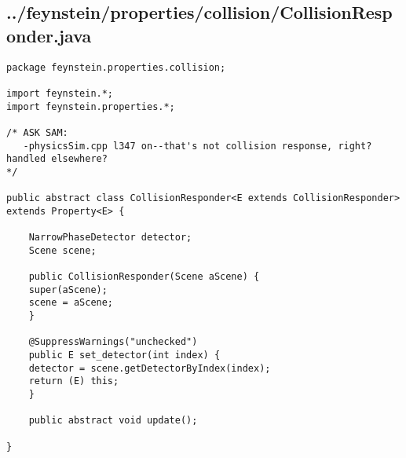 \subsection*{../feynstein/properties/collision/CollisionResponder.java}
\begin{lstlisting}
package feynstein.properties.collision;

import feynstein.*;
import feynstein.properties.*;

/* ASK SAM:
   -physicsSim.cpp l347 on--that's not collision response, right? handled elsewhere?
*/

public abstract class CollisionResponder<E extends CollisionResponder> extends Property<E> {
    
    NarrowPhaseDetector detector;
    Scene scene;

    public CollisionResponder(Scene aScene) {
	super(aScene);
	scene = aScene;
    }

    @SuppressWarnings("unchecked")
    public E set_detector(int index) {
	detector = scene.getDetectorByIndex(index);
	return (E) this;
    }

    public abstract void update();

}\end{lstlisting}

